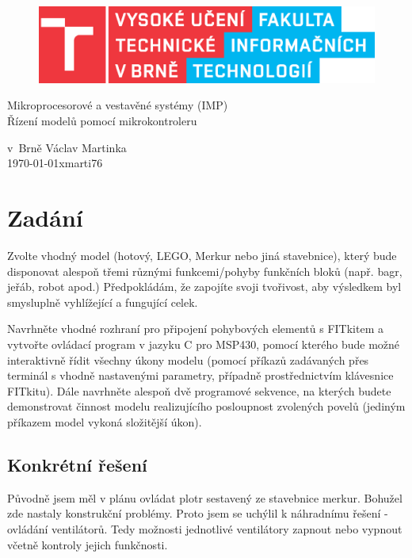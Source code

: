 \documentclass[11pt,a4paper,onecolumn,notitlepage]{article}
\begin{document}
	\begin{center}
		\begin{figure}[hb]
			\centering
			\includegraphics{FIT.eps}
			\label{fig:FIT}
		\end{figure}
	\LARGE
		Mikroprocesorové a vestavěné systémy (IMP)\\
	\Huge
		Řízení modelů pomocí mikrokontroleru\\
	\end{center}

{\Large v~Brně \hfill Václav Martinka\\
	\today \hfill xmarti76}

\newpage

\tableofcontents

\newpage


\section{Zadání}
Zvolte vhodný model (hotový, LEGO, Merkur nebo jiná stavebnice), který bude disponovat alespoň třemi různými funkcemi/pohyby funkčních bloků (např. bagr, jeřáb, robot apod.) Předpokládám, že zapojíte svoji tvořivost, aby výsledkem byl smysluplně vyhlížející a fungující celek.

Navrhněte vhodné rozhraní pro připojení pohybových elementů s FITkitem a vytvořte ovládací program v jazyku C pro MSP430, pomocí kterého bude možné interaktivně řídit všechny úkony modelu (pomocí příkazů zadávaných přes terminál s vhodně nastavenými parametry, případně prostřednictvím klávesnice FITkitu). Dále navrhněte alespoň dvě programové sekvence, na kterých budete demonstrovat činnost modelu realizujícího posloupnost zvolených povelů (jediným příkazem model vykoná složitější úkon).

	\subsection{Konkrétní řešení}
	Původně jsem měl v plánu ovládat plotr sestavený ze stavebnice merkur. Bohužel zde nastaly konstrukční problémy. Proto jsem se uchýlil k náhradnímu řešení - ovládání ventilátorů. Tedy možnosti jednotlivé ventilátory zapnout nebo vypnout včetně kontroly jejich funkčnosti.
	
\end{document}

